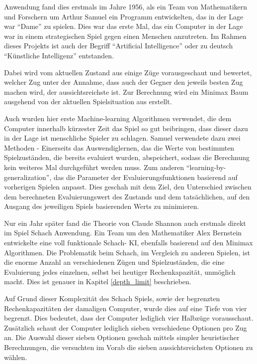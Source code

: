 
Anwendung fand dies erstmals im Jahre 1956, als ein Team von Mathematikern und Forschern um Arthur Samuel ein Programm entwickelten, das in der Lage war ``Dame'' zu spielen. Dies war das erste Mal, das ein Computer in der Lage war in einem strategischen Spiel gegen einen Menschen anzutreten. Im Rahmen dieses Projekts ist auch der Begriff ``Artificial Intelligence'' oder zu deutsch ``Künstliche Intelligenz'' entstanden. \cite{Kurenkov2019}

Dabei wird vom aktuellen Zustand aus einige Züge vorausgeschaut und bewertet, welcher Zug unter der Annahme, dass auch der Gegner den jeweils besten Zug machen wird, der aussichtsreichste ist. Zur Berechnung wird ein Minimax Baum ausgehend von der aktuellen Spielsituation aus erstellt.


Auch wurden hier erste Machine-learning Algorithmen verwendet, die dem Computer innerhalb kürzester Zeit das Spiel so gut beibringen, dass dieser dazu in der Lage ist menschliche Spieler zu schlagen. Samuel verwendete dazu zwei Methoden - Einerseits  das Auswendiglernen, das die Werte von bestimmten Spielzuständen, die bereits evaluiert wurden, abspeichert, sodass die Berechnung kein weiteres Mal durchgeführt werden muss. Zum anderen ``learning-by-generalization'', das die Parameter der Evaluierungsfunktionen basierend auf vorherigen Spielen anpasst. Dies geschah mit dem Ziel, den Unterschied zwischen dem berechneten Evaluierungswert des Zustands und dem tatsächlichen, auf den Ausgang des jeweiligen Spiels basierenden Werts zu minimieren. \cite{Samuel1959}


Nur ein Jahr später fand die Theorie von Claude Shannon auch erstmals direkt im Spiel Schach Anwendung. Ein Team um den Mathematiker Alex Bernstein entwickelte eine voll funktionale Schach- KI, ebenfalls basierend auf den Minimax Algorithmen. \cite{Kurenkov2019} Die Problematik beim Schach, im Vergleich zu anderen Spielen, ist die enorme Anzahl an verschiedenen Zügen und Spielzuständen, die eine Evaluierung jedes einzelnen, selbst bei heutiger Rechenkapazität, unmöglich macht. Dies ist genauer in Kapitel \ref{depth_limit} beschrieben. 

Auf Grund dieser Komplexität des Schach Spiels, sowie der begrenzten Rechenkapazitäten der damaligen Computer, wurde dies auf eine Tiefe von vier begrenzt. Dies bedeutet, dass der Computer lediglich vier Halbzüge vorausschaut. Zusätzlich schaut der Computer lediglich sieben verschiedene Optionen pro Zug an. Die Auswahl dieser sieben Optionen geschah mittels simpler heuristischer Berechnungen, die versuchten im Vorab die sieben aussichtsreichsten Optionen zu wählen. \cite{Bernstein1958}

